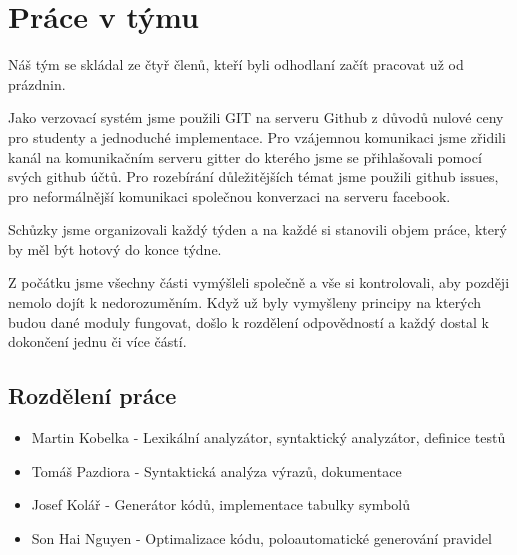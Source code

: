 \section{Práce v týmu}
Náš tým se skládal ze čtyř členů, kteří byli odhodlaní začít
pracovat už od prázdnin.

Jako verzovací systém jsme použili GIT
na serveru Github z důvodů nulové ceny pro studenty a jednoduché
implementace. Pro vzájemnou komunikaci jsme zřidili kanál na komunikačním serveru
gitter do kterého jsme se přihlašovali pomocí svých github účtů. Pro rozebírání
důležitějších témat jsme použili github issues, pro neformálnější komunikaci
společnou konverzaci na serveru facebook.

Schůzky jsme organizovali každý týden a na každé si stanovili objem práce, který by měl
být hotový do konce týdne.

Z počátku jsme všechny části vymýšleli společně a vše si kontrolovali,
aby později nemolo dojít k nedorozuměním. Když už byly vymyšleny
principy na kterých budou dané moduly fungovat, došlo k rozdělení
odpovědností a každý dostal k dokončení jednu či více částí.

\subsection{Rozdělení práce}
\begin{itemize}
    \item Martin Kobelka - Lexikální analyzátor, syntaktický analyzátor, definice testů
    \item Tomáš Pazdiora - Syntaktická analýza výrazů, dokumentace
    \item Josef Kolář - Generátor kódů, implementace tabulky symbolů
    \item Son Hai Nguyen - Optimalizace kódu, poloautomatické generování pravidel
\end{itemize}
